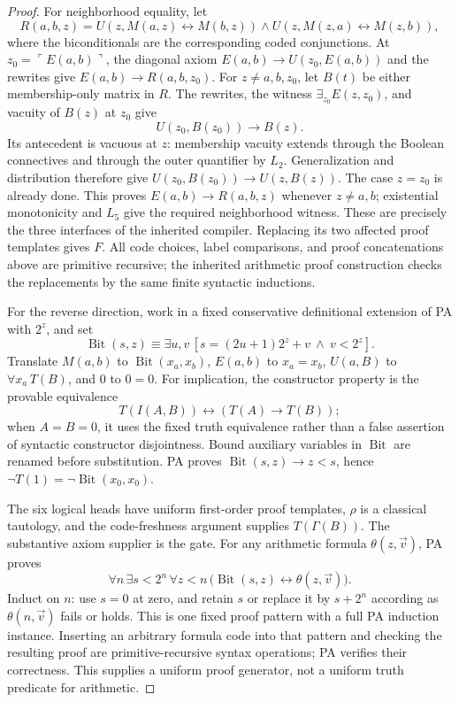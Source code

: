 \begin{proof}
For neighborhood equality, let
\[
 R(a,b,z)=U(z,M(a,z)\leftrightarrow M(b,z))
          \wedge U(z,M(z,a)\leftrightarrow M(z,b)),
\]
where the biconditionals are the corresponding coded conjunctions.
At $z_0=\ulcorner E(a,b)\urcorner$, the diagonal axiom
$E(a,b)\to U(z_0,E(a,b))$ and the rewrites give
$E(a,b)\to R(a,b,z_0)$.  For $z\ne a,b,z_0$, let $B(t)$ be either
membership-only matrix in $R$.  The rewrites, the witness
$\exists_{z_0}E(z,z_0)$, and vacuity of $B(z)$ at $z_0$ give
\[
 U(z_0,B(z_0))\to B(z).
\]
Its antecedent is vacuous at $z$: membership vacuity extends through
the Boolean connectives and through the outer quantifier by $L_2$.
Generalization and distribution therefore give
$U(z_0,B(z_0))\to U(z,B(z))$.  The case $z=z_0$ is already done.
This proves $E(a,b)\to R(a,b,z)$ whenever $z\ne a,b$; existential
monotonicity and $L_5$ give the required neighborhood witness.  These
are precisely the three interfaces of the inherited compiler.
Replacing its two affected proof templates gives $F$.
All code choices, label comparisons, and proof concatenations above
are primitive recursive; the inherited arithmetic proof construction
checks the replacements by the same finite syntactic inductions.

For the reverse direction, work in a fixed conservative definitional
extension of PA with $2^z$, and set
\[
 \operatorname{Bit}(s,z)\equiv
 \exists u,v\,[s=(2u+1)2^z+v\ \wedge\ v<2^z].
\]
Translate $M(a,b)$ to $\operatorname{Bit}(x_a,x_b)$, $E(a,b)$ to
$x_a=x_b$, $U(a,B)$ to $\forall x_a\,T(B)$, and $0$ to $0=0$.
For implication, the constructor property is the provable equivalence
\[
 T(I(A,B))\leftrightarrow(T(A)\to T(B));
\]
when $A=B=0$, it uses the fixed truth equivalence rather than a false
assertion of syntactic constructor disjointness.  Bound auxiliary
variables in $\operatorname{Bit}$ are renamed before substitution.
PA proves $\operatorname{Bit}(s,z)\to z<s$, hence
$\neg T(1)=\neg\operatorname{Bit}(x_0,x_0)$.

The six logical heads have uniform first-order proof templates, $\rho$
is a classical tautology, and the code-freshness argument supplies
$T(\Gamma(B))$.  The substantive axiom supplier is the gate.  For any
arithmetic formula $\theta(z,\vec v)$, PA proves
\begin{equation}
 \forall n\,\exists s<2^n\,\forall z<n\,
  \bigl(\operatorname{Bit}(s,z)\leftrightarrow\theta(z,\vec v)\bigr).
 \label{cal:comprehension}
\end{equation}
Induct on $n$: use $s=0$ at zero, and retain $s$ or replace it by
$s+2^n$ according as $\theta(n,\vec v)$ fails or holds.  This is one
fixed proof pattern with a full PA induction instance.  Inserting an
arbitrary formula code into that pattern and checking the resulting
proof are primitive-recursive syntax operations; PA verifies their
correctness.  This supplies a uniform proof generator, not a uniform
truth predicate for arithmetic.


\end{proof}
